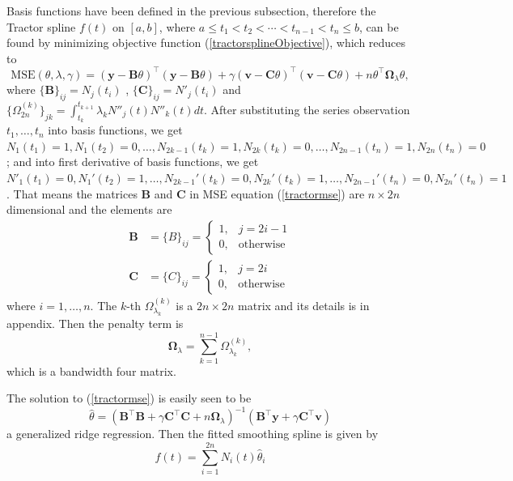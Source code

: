 Basis functions have been defined in the previous subsection, therefore the Tractor spline $f(t)$ on $[a,b]$, where $a \leq t_1 < t_2< \cdots < t_{n-1}<t_n \leq b$, can be found by minimizing  objective function (\ref{tractorsplineObjective}), which reduces to
\begin{equation}\label{tractormse}
\text{MSE}(\theta, \lambda,\gamma) = (\mathbf{y}-\mathbf{B}\theta)^\top (\mathbf{y}-\mathbf{B}\theta) +\gamma (\mathbf{v}-\mathbf{C}\theta)^\top (\mathbf{v}-\mathbf{C}\theta)+n \theta^\top\mathbf{\Omega}_{\lambda}\theta,
\end{equation}
where $\{\mathbf{B}\}_{ij} = N_j(t_i)$ , $\{\mathbf{C}\}_{ij} = N'_j(t_i)$ and $\{\Omega_{2n}^{(k)} \}_{jk}=\int_{t_k}^{t_{k+1}}\lambda_k N''_j(t)N''_k(t)dt$. After substituting the series observation $t_1, \ldots, t_n$ into basis functions, we get $N_1(t_1)=1, N_1(t_2)=0, \ldots, N_{2k-1}(t_{k})=1, N_{2k}(t_{k})=0, \ldots, N_{2n-1}(t_n)=1, N_{2n}(t_n)=0$; and into first derivative of basis functions, we get $N'_1(t_1)=0, N_1'(t_2)=1, \ldots, N_{2k-1}'(t_{k})=0, N_{2k}'(t_{k})=1, \ldots, N_{2n-1}'(t_n)=0, N_{2n}'(t_n)=1$. That means the matrices $\mathbf{B}$ and $\mathbf{C}$ in MSE equation (\ref{tractormse}) are $n \times 2n$ dimensional and the elements are
\begin{align}
\mathbf{B}&=\{B\}_{ij}=\begin{cases}
1, & j=2i-1\\
0, & \mbox{otherwise}
\end{cases}\\
\mathbf{C}&=\{C\}_{ij}=\begin{cases}
1, & j=2i\\
0, & \mbox{otherwise}
\end{cases}
\end{align}
where $i=1, \ldots, n$.  The $k$-th $\Omega_{\lambda_k}^{(k)}$ is a $2n \times 2n$ matrix and its details is in appendix. Then the penalty term is
\begin{equation}
\mathbf{\Omega}_\lambda=\sum_{k=1}^{n-1}\Omega_{\lambda_k}^{(k)},
\end{equation}
which is a bandwidth four matrix.


The solution to (\ref{tractormse}) is easily seen to be
\begin{equation}\label{thetahat}
\hat{\theta}=(\mathbf{B}^\top\mathbf{B}+\gamma\mathbf{C}^\top\mathbf{C}+n\mathbf{\Omega}_{\lambda})^{-1}(\mathbf{B}^\top\mathbf{y}+\gamma\mathbf{C}^\top\mathbf{v})
\end{equation}
a generalized ridge regression. Then the fitted smoothing spline is given by
\begin{equation}
\hat{f}(t)=\sum_{i=1}^{2n}N_i(t)\hat{\theta}_i
\end{equation}


